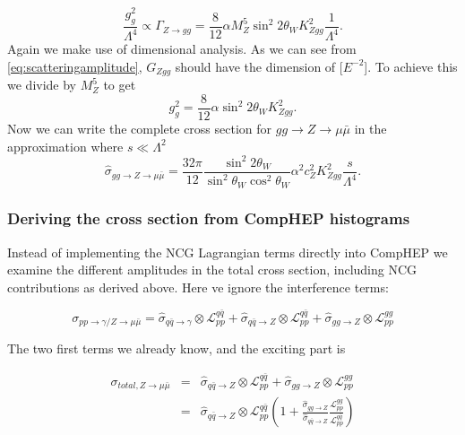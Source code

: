 \begin{equation}
	\frac{g_g^2}{\Lambda^4} \propto \Gamma_{Z \rightarrow gg} = \frac{8}{12} \alpha M_Z^5 \sin^2{2\theta_W} K_{Zgg}^2 \frac{1}{\Lambda^4}.
\end{equation}
Again we make use of dimensional analysis. As we can see from \eqref{eq:scatteringamplitude}, $G_{Zgg}$ should have the dimension of [$E^{-2}$]. To achieve this we divide by $M_Z^5$ to get
\begin{equation}
	g_g^2 = \frac{8}{12} \alpha \sin^2{2\theta_W} K_{Zgg}^2.
\end{equation}
Now we can write the complete cross section for $gg \rightarrow Z \rightarrow \mu \bar \mu$ in the approximation where $s \ll \Lambda^2$
\begin{equation} \label{eq:sigmahatgg}
	\hat \sigma_{gg \rightarrow Z \rightarrow \mu \bar \mu} = \frac{32\pi}{12} \frac{\sin^2{2\theta_W}}{\sin^2{\theta_W}\cos^2{\theta_W}} \alpha^2 c_Z^2 K_{Zgg}^2 \frac{s}{\Lambda^4}.
\end{equation}

\subsubsection{Deriving the cross section from CompHEP histograms}
Instead of implementing the NCG Lagrangian terms directly into CompHEP we examine the different amplitudes in the total cross section, including NCG contributions as derived above. Here ve ignore the interference terms:

\begin{equation}
	\sigma_{pp \rightarrow \gamma/ Z \rightarrow \mu \bar \mu} = \hat \sigma_{q \bar q \rightarrow \gamma} \otimes \mathcal{L}_{pp}^{q \bar q}+ \hat \sigma_{q \bar q \rightarrow Z} \otimes \mathcal{L}_{pp}^{q \bar q}+ \hat \sigma_{gg \rightarrow Z} \otimes \mathcal{L}_{pp}^{gg}
\end{equation}

The two first terms we already know, and the exciting part is 

\begin{eqnarray} \label{eq:qqggztotal}
	\sigma_{total, Z \rightarrow \mu \bar \mu} &=& \hat \sigma_{q \bar q \rightarrow Z} \otimes \mathcal{L}_{pp}^{q \bar q}+ \hat \sigma_{gg \rightarrow Z} \otimes \mathcal{L}_{pp}^{gg} \nonumber \\
	&=&\hat \sigma_{q \bar q \rightarrow Z} \otimes \mathcal{L}_{pp}^{q \bar q} \left (1+ \frac{\hat \sigma_{gg \rightarrow Z}}{\hat \sigma_{q \bar q \rightarrow Z}} \frac{\mathcal{L}_{pp}^{gg}} {\mathcal{L}_{pp}^{q \bar q}} \right )
\end{eqnarray}


